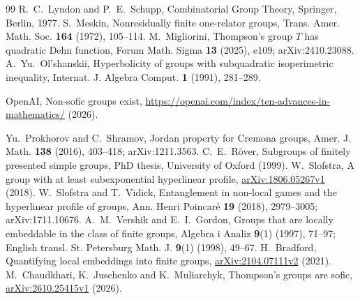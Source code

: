\documentclass[11pt,a4paper]{article}
\theoremstyle{plain}
\theoremstyle{definition}
\theoremstyle{remark}
\begin{document}
\begin{thebibliography}{99}
 R.~C.~Lyndon and P.~E.~Schupp, Combinatorial Group Theory, Springer, Berlin, 1977.
 S.~Meskin, Nonresidually finite one-relator groups, Trans. Amer. Math. Soc. \textbf{164} (1972), 105--114.
 M.~Migliorini, Thompson's group $T$ has quadratic Dehn function, Forum Math. Sigma \textbf{13} (2025), e109; arXiv:2410.23088.
 A.~Yu.~Ol'shanskii, Hyperbolicity of groups with subquadratic isoperimetric inequality, Internat. J. Algebra Comput. \textbf{1} (1991), 281--289.
 {\raggedright OpenAI, Non-sofic groups exist, \url{https://openai.com/index/ten-advances-in-mathematics/} (2026).\par}
 Yu.~Prokhorov and C.~Shramov, Jordan property for Cremona groups, Amer. J. Math. \textbf{138} (2016), 403--418; arXiv:1211.3563.
 C.~E.~Röver, Subgroups of finitely presented simple groups, PhD thesis, University of Oxford (1999).
 W.~Slofstra, A group with at least subexponential hyperlinear profile, \href{https://arxiv.org/abs/1806.05267v1}{arXiv:1806.05267v1} (2018).
 W.~Slofstra and T.~Vidick, Entanglement in non-local games and the hyperlinear profile of groups, Ann. Henri Poincaré \textbf{19} (2018), 2979--3005; arXiv:1711.10676.
 A.~M.~Vershik and E.~I.~Gordon, Groups that are locally embeddable in the class of finite groups, Algebra i Analiz \textbf{9}(1) (1997), 71--97; English transl. St. Petersburg Math. J. \textbf{9}(1) (1998), 49--67.
 H.~Bradford, Quantifying local embeddings into finite groups, \href{https://arxiv.org/abs/2104.07111v2}{arXiv:2104.07111v2} (2021).
 M.~Chaudkhari, K.~Juschenko and K.~Muliarchyk,
Thompson's groups are sofic,
\href{https://arxiv.org/abs/2610.25415v1}{arXiv:2610.25415v1} (2026).
\end{thebibliography}
\end{document}
